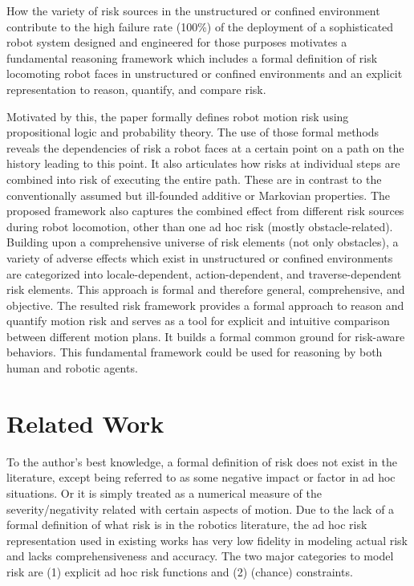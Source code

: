 \documentclass[letterpaper]{article} %
\begin{document}
How the variety of risk sources in the unstructured or confined environment contribute to the high failure rate (100\%) of the deployment of a sophisticated robot system designed and engineered for those purposes motivates a fundamental reasoning framework which includes a formal definition of risk locomoting robot faces in unstructured or confined environments and an explicit representation to reason, quantify, and compare risk.  

Motivated by this, the paper formally defines robot motion risk using propositional logic and probability theory. The use of those formal methods reveals the dependencies of risk a robot faces at a certain point on a path on the history leading to this point. It also articulates how risks at individual steps are combined into risk of executing the entire path. These are in contrast to the conventionally assumed but ill-founded additive or Markovian properties. The proposed framework also captures the combined effect from different risk sources during robot locomotion, other than one ad hoc risk (mostly obstacle-related). Building upon a comprehensive universe of risk elements (not only obstacles), a variety of adverse effects which exist in unstructured or confined environments are categorized into locale-dependent, action-dependent, and traverse-dependent risk elements. This approach is formal and therefore general, comprehensive, and objective. The resulted risk framework provides a formal approach to reason and quantify motion risk and serves as a tool for explicit and intuitive comparison between different motion plans. It builds a formal common ground for risk-aware behaviors. This fundamental framework could be used for reasoning by both human and robotic agents. 

\section{Related Work}
\label{sec::related_work}
To the author's best knowledge, a formal definition of risk does not exist in the literature, except being referred to as some negative impact or factor in ad hoc situations. Or it is simply treated as a numerical measure of the severity/negativity related with certain aspects of motion. Due to the lack of a formal definition of what risk is in the robotics literature, the ad hoc risk representation used in existing works has very low fidelity in modeling actual risk and lacks comprehensiveness and accuracy. The two major categories to model risk are (1) explicit ad hoc risk functions and (2) (chance) constraints. 
\end{document}
